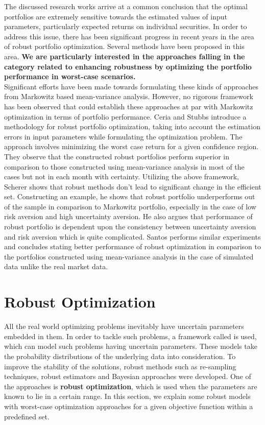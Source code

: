 \documentclass[a4paper,12pt,twoside]{article}
\begin{document}
The discussed research works arrive at a common conclusion that the optimal portfolios are extremely sensitive towards the estimated values of input parameters, particularly expected returns on individual securities. In order to address this issue, there has been significant progress in recent years in the area of robust portfolio optimization. Several methods have been proposed in this area. \textbf{We are particularly interested in the approaches falling in the category related to enhancing robustness by optimizing the portfolio performance in worst-case scenarios.} \\

Significant efforts have been made towards formulating these kinds of approaches from Markowitz based mean-variance analysis. However, no rigorous framework has been observed that could establish these approaches at par with Markowitz optimization in terms of portfolio performance. Ceria and Stubbs \cite{Ceria} introduce a methodology for robust portfolio optimization, taking into account the estimation errors in input parameters while formulating the optimization problem. The approach involves minimizing the worst case return for a given confidence region. They observe that the constructed robust portfolios perform superior in comparison to those constructed using mean-variance analysis in most of the cases but not in each month with certainty. Utilizing the above framework, Scherer\cite{Scherer} shows that robust methods don't lead to significant change in the efficient set. Constructing an example, he shows that robust portfolio underperforms out of the sample in comparison to Markowitz portfolio, especially in the case of low risk aversion and high uncertainty aversion. He also argues that performance of robust portfolio is dependent upon the consistency between uncertainty aversion and risk aversion which is quite complicated. Santos\cite{santos} performs similar experiments and concludes stating better performance of robust optimization in comparison to the portfolios constructed using mean-variance analysis in the case of simulated data unlike the real market data.

\section{Robust Optimization}
All the real world optimizing problems inevitably have uncertain parameters embedded in them. In order to tackle such problems, a framework called  \cite{stochastic_prog} is used, which can model such problems having uncertain parameters. These models take the probability distributions of the underlying data into consideration. To improve the stability of the solutions, robust methods such as re-sampling techniques, robust estimators and Bayesian approaches were developed. One of the approaches is \textbf{robust optimization}, which is used when the parameters are known to lie in a certain range. In this section, we explain some robust models with worst-case optimization approaches for a given objective function within a predefined  set. \\
\end{document}
